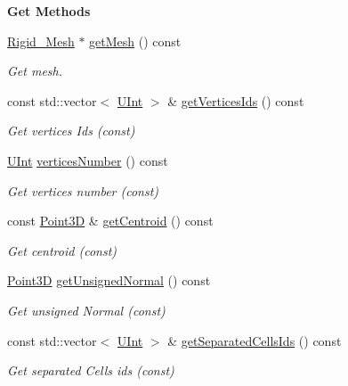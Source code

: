 \begin{Indent}{\bf Get Methods}\par
\begin{DoxyCompactItemize}
\item 
\hyperlink{classFVCode3D_1_1Rigid__Mesh}{Rigid\+\_\+\+Mesh} $\ast$ \hyperlink{classFVCode3D_1_1Rigid__Mesh_1_1Facet_a4397809e51ea9a304165f11f8340b6e8}{get\+Mesh} () const 
\begin{DoxyCompactList}\small\item\em Get mesh. \end{DoxyCompactList}\item 
const std\+::vector$<$ \hyperlink{namespaceFVCode3D_a4bf7e328c75d0fd504050d040ebe9eda}{U\+Int} $>$ \& \hyperlink{classFVCode3D_1_1Rigid__Mesh_1_1Facet_af92ad0b6b79c69f6c04584301b8998a7}{get\+Vertices\+Ids} () const 
\begin{DoxyCompactList}\small\item\em Get vertices Ids (const) \end{DoxyCompactList}\item 
\hyperlink{namespaceFVCode3D_a4bf7e328c75d0fd504050d040ebe9eda}{U\+Int} \hyperlink{classFVCode3D_1_1Rigid__Mesh_1_1Facet_a5d18db39a0eeb85e6a4afc2b09813201}{vertices\+Number} () const 
\begin{DoxyCompactList}\small\item\em Get vertices number (const) \end{DoxyCompactList}\item 
const \hyperlink{classFVCode3D_1_1Point3D}{Point3D} \& \hyperlink{classFVCode3D_1_1Rigid__Mesh_1_1Facet_a0d4bcc392ef3da56ccdb40c22b6319e3}{get\+Centroid} () const 
\begin{DoxyCompactList}\small\item\em Get centroid (const) \end{DoxyCompactList}\item 
\hyperlink{classFVCode3D_1_1Point3D}{Point3D} \hyperlink{classFVCode3D_1_1Rigid__Mesh_1_1Facet_ae8d74e38b74075a3ced8b1a229860120}{get\+Unsigned\+Normal} () const 
\begin{DoxyCompactList}\small\item\em Get unsigned Normal (const) \end{DoxyCompactList}\item 
const std\+::vector$<$ \hyperlink{namespaceFVCode3D_a4bf7e328c75d0fd504050d040ebe9eda}{U\+Int} $>$ \& \hyperlink{classFVCode3D_1_1Rigid__Mesh_1_1Facet_abd6ae01e794c32505ada890dedf427da}{get\+Separated\+Cells\+Ids} () const 
\begin{DoxyCompactList}\small\item\em Get separated Cells ids (const) \end{DoxyCompactList}\item 

\end{DoxyCompactItemize}
\end{Indent}
